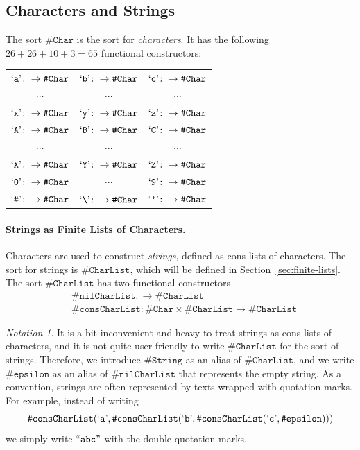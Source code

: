 \documentclass[UTF8,11pt]{article}
\newcounter{thmcounter}
\theoremstyle{plain}
\theoremstyle{definition}
\theoremstyle{remark}
\newtheorem{notation}   [thmcounter]{Notation}
\newcommand{\sharpsymbol}{\#}
\newcommand{\KChar}{\texttt{\sharpsymbol Char}}
\newcommand{\KCharList}{\texttt{\sharpsymbol CharList}}
\newcommand{\KString}{\texttt{\sharpsymbol String}}
\newcommand{\Kepsilon}{\texttt{\sharpsymbol epsilon}}
\newcommand{\KnilKCharList}{\texttt{\sharpsymbol nilCharList}}
\newcommand{\KconsKCharList}{\texttt{\sharpsymbol consCharList}}
\newcommand{\quottt}[1]{\textrm{\lq\texttt{#1}\rq}}
\newcommand{\qquottt}[1]{\textrm{``\texttt{#1}''}}
\newcommand{\slashsymbol}{\symbol{92}}
\begin{document}
\subsection{Characters and Strings}

\label{sec:chars-string}
The sort $\KChar$ is the sort for \emph{characters}. It has the following $26 + 
26 + 10 + 3 = 65$ functional constructors:
\begin{center}
	\begin{tabular}{c c c}
		$\quottt{a} \colon \to \KChar$ & $\quottt{b} \colon \to \KChar$ & 
		$\quottt{c} \colon \to \KChar$ \\
		$\cdots$ & $\cdots$ & $\cdots$ \\
		$\quottt{x} \colon \to \KChar$ & $\quottt{y} \colon \to \KChar$ & 
		$\quottt{z} \colon \to \KChar$ \\
		$\quottt{A} \colon \to \KChar$ & $\quottt{B} \colon \to \KChar$ & 
		$\quottt{C} \colon \to \KChar$ \\
		$\cdots$ & $\cdots$ & $\cdots$ \\
		$\quottt{X} \colon \to \KChar$ & $\quottt{Y} \colon \to \KChar$ & 
		$\quottt{Z} \colon \to \KChar$ \\
		$\quottt{0} \colon \to \KChar$ & $\cdots$ & $\quottt{9} \colon \to 
		\KChar$ 
		\\
		$\quottt{\sharpsymbol} \colon \to \KChar$ & $\quottt{\slashsymbol} 
		\colon \to \KChar$ & $\quottt{'} \colon \to \KChar$
	\end{tabular}
\end{center}

\paragraph{Strings as Finite Lists of Characters.}\quad
Characters are used to construct \emph{strings}, defined as cons-lists of 
characters.
The sort for strings is $\KCharList$, which will be defined in 
Section~\ref{sec:finite-lists}.
The sort $\KCharList$ has two functional constructors
\begin{align*}
& \KnilKCharList \colon \to \KCharList \\
& \KconsKCharList \colon \KChar \times \KCharList \to \KCharList
\end{align*}

\begin{notation}\label{not:strings}
It is a bit inconvenient and heavy to treat strings as cons-lists of 
characters, and it is not quite user-friendly to write $\KCharList$ for the 
sort of strings.
Therefore, we introduce $\KString$ as an alias of $\KCharList$, and we write 
$\Kepsilon$ as an alias of $\KnilKCharList$ that represents the empty string.
	As a convention, strings are often represented by texts wrapped with quotation marks. 
	For example, instead of writing
	$$
	\KconsKCharList(\quottt{a}, \KconsKCharList(\quottt{b}, 
	\KconsKCharList(\quottt{c}, \Kepsilon)))
	$$
	we simply write $\qquottt{abc}$ with the double-quotation marks.
\end{notation}
\end{document}
